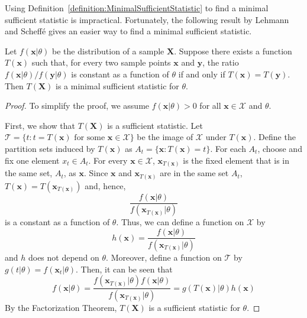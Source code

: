 Using Definition~\ref{definition:MinimalSufficientStatistic} to find a minimal sufficient statistic is impractical.
Fortunately, the following result by Lehmann and Scheff\'{e} gives an easier way to find a minimal sufficient statistic.

\begin{theorem}
Let $f(\mathbf{x}|\theta)$ be the distribution of a sample $\mathbf{X}$.
Suppose there exists a function $T(\mathbf{x})$ such that, for every two sample points $\mathbf{x}$ and $\mathbf{y}$, the ratio $f(\mathbf{x}|\theta)/f(\mathbf{y}|\theta)$ is constant as a function of $\theta$ if and only if $T(\mathbf{x}) = T(\mathbf{y})$.
Then $T(\mathbf{X})$ is a minimal sufficient statistic for $\theta$.
\end{theorem}
\begin{proof}
To simplify the proof, we assume $f(\mathbf{x}|\theta) > 0$ for all $\mathbf{x} \in \mathcal{X}$ and $\theta$.

First, we show that $T(\mathbf{X})$ is a sufficient statistic.
Let $\mathcal{T} = \{ t : t=T(\mathbf{x}) \text{ for some } \mathbf{x} \in \mathcal{X} \}$ be the image of $\mathcal{X}$ under $T(\mathbf{x})$.
Define the partition sets induced by $T(\mathbf{x})$ as $A_t = \{ \mathbf{x} : T(\mathbf{x}) = t \}$.
For each $A_t$, choose and fix one element $x_t \in A_t$.
For every $\mathbf{x} \in \mathcal{X}$, $\mathbf{x}_{T(\mathbf{x})}$ is the fixed element that is in the same set, $A_t$, as $\mathbf{x}$.
Since $\mathbf{x}$ and  $\mathbf{x}_{T(\mathbf{x})}$ are in the same set $A_t$, $T(\mathbf{x}) = T(\mathbf{x}_{T(\mathbf{x})})$ and, hence,
\begin{equation*}
\frac{ f(\mathbf{x}|\theta) }{ f \left( \mathbf{x}_{T(\mathbf{x})} | \theta \right) }
\end{equation*}
is a constant as a function of $\theta$.
Thus, we can define a function on $\mathcal{X}$ by
\begin{equation*}
h(\mathbf{x}) = \frac{ f(\mathbf{x}|\theta) }{ f \left( \mathbf{x}_{T(\mathbf{x})} | \theta \right) }
\end{equation*}
and $h$ does not depend on $\theta$.
Moreover, define a function on $\mathcal{T}$ by $g(t|\theta) = f(\mathbf{x}_t|\theta)$.
Then, it can be seen that
\begin{equation*}
f(\mathbf{x}|\theta)
= \frac{ f \left( \mathbf{x}_{T(\mathbf{x})} | \theta \right)
f(\mathbf{x}|\theta) }
{ f \left( \mathbf{x}_{T(\mathbf{x})} | \theta \right) }
= g(T(\mathbf{x})|\theta) h(\mathbf{x})
\end{equation*}
By the Factorization Theorem, $T(\mathbf{X})$ is a sufficient statistic for $\theta$.


\end{proof}
